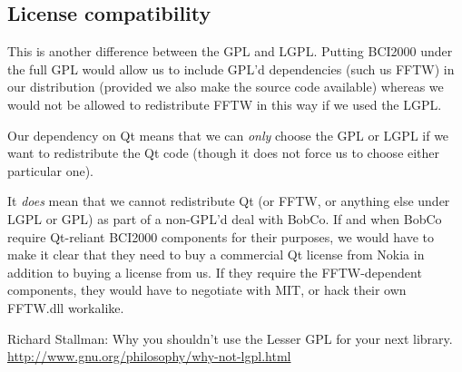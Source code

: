 \documentclass{article}
\begin{document}
\subsection*{License compatibility}

This is another difference between the GPL and LGPL.  Putting BCI2000 under the full GPL would allow us to include GPL'd dependencies (such us FFTW) in our distribution (provided we also make the source code available) whereas we would not be allowed to redistribute FFTW in this way if we used the LGPL.

Our dependency on Qt means that we can {\em only} choose the GPL or LGPL if we want to redistribute the Qt code (though it does not force us to choose either particular one).

It {\em does} mean that we cannot redistribute Qt (or FFTW, or anything else under LGPL or GPL) as part of a non-GPL'd deal with BobCo. If and when BobCo require Qt-reliant BCI2000 components for their purposes, we would have to make it clear that they need to buy a commercial Qt license from Nokia in addition to buying a license from us. If they require the FFTW-dependent components, they would have to negotiate with MIT, or hack their own FFTW.dll workalike. 


\begin{thebibliography}{10}
	Richard Stallman:
	\newblock Why you shouldn't use the Lesser GPL for your next library.
	\newblock \url{http://www.gnu.org/philosophy/why-not-lgpl.html}
\end{thebibliography}
\end{document}
